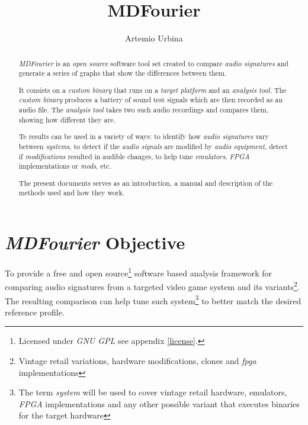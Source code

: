 \documentclass[10pt,a4paper]{report}
\title{MDFourier}
\author{Artemio Urbina}
\begin{document}
	
\begin{titlepage}
	\maketitle
	\thispagestyle{empty}
\end{titlepage}

\begin{abstract}
\textit{MDFourier} is an \textit{open source} software tool set created to compare \textit{audio signatures} and generate a series of graphs that show the differences between them.

It consists on a \textit{custom binary} that runs on a \textit{target platform} and an \textit{analysis tool}. The \textit{custom binary} produces a battery of sound test signals which are then recorded as an audio file. The \textit{analysis tool} takes two such audio recordings and compares them, showing how different they are.

Te results can be used in a variety of ways: to identify how \textit{audio signatures} vary between \textit{systems}, to detect if the \textit{audio signals} are modified by \textit{audio equipment}, detect if \textit{modifications} resulted in audible changes, to help tune \textit{emulators}, \textit{FPGA} implementations or \textit{mods}, etc.

The present documents serves as an introduction, a manual and description of the methods used and how they work.
\end{abstract}

\tableofcontents

\chapter{\textit{MDFourier} Objective}

To provide a free and open source\footnote{Licensed under \textit{GNU GPL} see appendix \ref{license}.} software based analysis framework for comparing audio signatures from a targeted video game system and its variants\footnote{Vintage retail variations, hardware modifications, clones and \textit{\acrfull{fpga}} implementations}. The resulting comparison can help tune such system\footnote{The term \textit{system} will be used to cover vintage retail hardware, emulators, \textit{FPGA} implementations and any other possible variant that executes binaries for the target hardware} to better match the desired reference profile.
\end{document}
